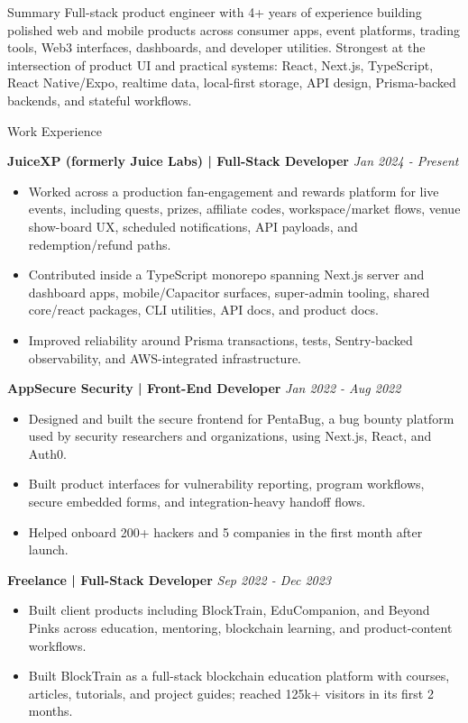 \documentclass{resume}
\begin{document}
\begin{rSection}{Summary}
Full-stack product engineer with 4+ years of experience building polished web and mobile products across consumer apps, event platforms, trading tools, Web3 interfaces, dashboards, and developer utilities. Strongest at the intersection of product UI and practical systems: React, Next.js, TypeScript, React Native/Expo, realtime data, local-first storage, API design, Prisma-backed backends, and stateful workflows.
\end{rSection}

\begin{rSection}{Work Experience}

{\bf JuiceXP (formerly Juice Labs) | Full-Stack Developer} \hfill {\em Jan 2024 - Present}
\begin{itemize}
  \item Worked across a production fan-engagement and rewards platform for live events, including quests, prizes, affiliate codes, workspace/market flows, venue show-board UX, scheduled notifications, API payloads, and redemption/refund paths.
  \vspace{-0.2cm}\item Contributed inside a TypeScript monorepo spanning Next.js server and dashboard apps, mobile/Capacitor surfaces, super-admin tooling, shared core/react packages, CLI utilities, API docs, and product docs.
  \vspace{-0.2cm}\item Improved reliability around Prisma transactions, tests, Sentry-backed observability, and AWS-integrated infrastructure.
\end{itemize}

{\bf AppSecure Security | Front-End Developer} \hfill {\em Jan 2022 - Aug 2022}
\begin{itemize}
  \item Designed and built the secure frontend for PentaBug, a bug bounty platform used by security researchers and organizations, using Next.js, React, and Auth0.
  \vspace{-0.2cm}\item Built product interfaces for vulnerability reporting, program workflows, secure embedded forms, and integration-heavy handoff flows.
  \vspace{-0.2cm}\item Helped onboard 200+ hackers and 5 companies in the first month after launch.
\end{itemize}

{\bf Freelance | Full-Stack Developer} \hfill {\em Sep 2022 - Dec 2023}
\begin{itemize}
  \item Built client products including BlockTrain, EduCompanion, and Beyond Pinks across education, mentoring, blockchain learning, and product-content workflows.
  \vspace{-0.2cm}\item Built BlockTrain as a full-stack blockchain education platform with courses, articles, tutorials, and project guides; reached 125k+ visitors in its first 2 months.
\end{itemize}

\end{rSection}
\end{document}
